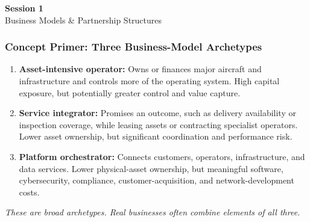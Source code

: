 \documentclass{beamer}
\begin{document}
\begin{frame}[c]
  \begin{center}
    \huge\color{cuhkpurple}\textbf{Session 1}\\
    \vspace{0.5cm}
    \Large Business Models \& Partnership Structures
  \end{center}
\end{frame}

\begin{frame}[t]
\frametitle{Concept Primer: Three Business-Model Archetypes}
\begin{enumerate}
\item \textbf{Asset-intensive operator:} Owns or finances major aircraft and infrastructure and controls more of the operating system. High capital exposure, but potentially greater control and value capture.
\item \textbf{Service integrator:} Promises an outcome, such as delivery availability or inspection coverage, while leasing assets or contracting specialist operators. Lower asset ownership, but significant coordination and performance risk.
\item \textbf{Platform orchestrator:} Connects customers, operators, infrastructure, and data services. Lower physical-asset ownership, but meaningful software, cybersecurity, compliance, customer-acquisition, and network-development costs.
\end{enumerate}
\textit{These are broad archetypes. Real businesses often combine elements of all three.}
\end{frame}
\end{document}
